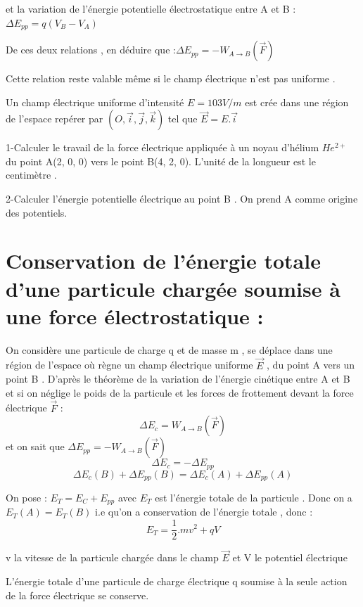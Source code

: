 \documentclass[12pt]{article}
\begin{document}
et la variation de l’énergie potentielle électrostatique entre A et
B : $\Delta{E_{pp}}  = q(V_B - V_A)$

De ces deux relations , en déduire que :$\Delta{E_{pp}}  = -W_{A\rightarrow B}(\vec{F}) $
 
Cette relation reste valable même si le champ électrique n’est pas
uniforme .
\begin{tcolorbox}[colback=pink!10!white,
                  colframe=blue!15!gray,
                  title=Application -2- :
                 ]
Un champ électrique uniforme d’intensité $E = 103V/m$ est crée
  dans une région de l’espace repérer par $(O, \vec{i},\vec{j}, \vec{k})$ tel que $\vec{E} = E.\vec{i}$

1-Calculer le travail de la force électrique appliquée à un noyau d’hélium $He^{2+}$ du point A(2, 0, 0) vers le point B(4, 2, 0).
L’unité de la longueur est le centimètre .

  2-Calculer l’énergie potentielle électrique au point B . On prend
A comme origine des potentiels.

\end{tcolorbox}

\section{Conservation de l’énergie totale d’une
particule chargée soumise à une force
électrostatique :  }

On considère une particule de charge q et de masse m , se déplace
dans une région de l’espace où règne un champ électrique
uniforme $\vec{E}$ , du point A vers un point B .
D’après le théorème de la variation de l’énergie cinétique entre A
et B et si on néglige le poids de la particule et les forces de
frottement devant la force électrique $\vec{F}$ :
$$\Delta{E_{c}}  = W_{A\rightarrow B}(\vec{F})  $$
et on sait que $\Delta{E_{pp}}  = -W_{A\rightarrow B}(\vec{F}) $
$$ \Delta{E_{c}}  = -\Delta{E_{pp}} $$ 
$$ \Delta{E_{c}(B)} + \Delta{E_{pp}(B)} =  \Delta{E_{c}(A)} + \Delta{E_{pp}(A)} $$ 

On pose : $E_T = E_{C} + E_{pp}$ avec $E_T$ est l’énergie totale de la
particule . Donc on a $E_T(A) = E_T(B)$ i.e qu’on a conservation de
l’énergie totale , donc : $$E_T = \frac{1}{2}. mv^2 + qV$$

v la vitesse de la particule chargée dans le champ $\vec{E}$ et V le
potentiel électrique

L’énergie totale d’une particule de charge électrique q soumise à la
seule action de la force électrique se conserve.
\end{document}
